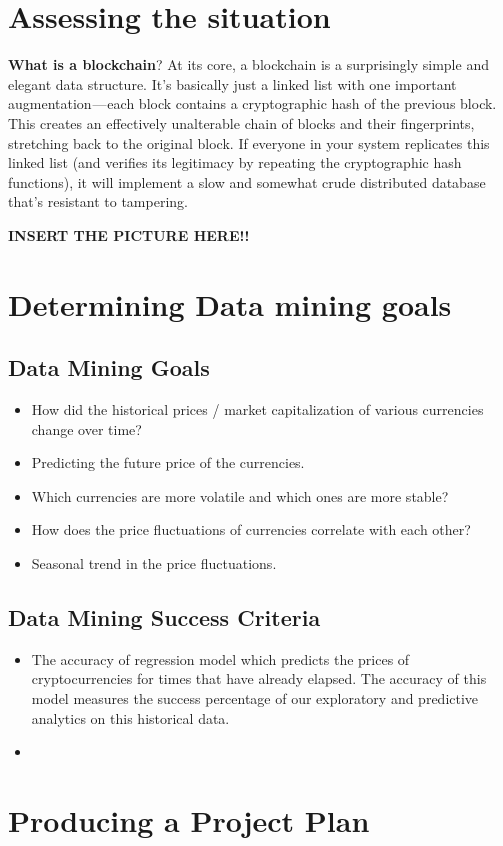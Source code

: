 \documentclass{article}
\begin{document}
\section{Assessing the situation}
\textbf{What is a blockchain}?
At its core, a blockchain is a surprisingly simple and elegant data structure. It’s basically just a linked list with one important augmentation — each block contains a cryptographic hash of the previous block. This creates an effectively unalterable chain of blocks and their fingerprints, stretching back to the original block. If everyone in your system replicates this linked list (and verifies its legitimacy by repeating the cryptographic hash functions), it will implement a slow and somewhat crude distributed database that’s resistant to tampering.

\textbf{INSERT THE PICTURE HERE!!}

\section{Determining Data mining goals}
\subsection{Data Mining Goals}
\begin{itemize}
\item How did the historical prices / market capitalization of various currencies change over time?
\item Predicting the future price of the currencies.
\item Which currencies are more volatile and which ones are more stable?
\item How does the price fluctuations of currencies correlate with each other?
\item Seasonal trend in the price fluctuations.
\end{itemize}

\subsection{Data Mining Success Criteria}
\begin{itemize}
    \item The accuracy of regression model which predicts the prices of cryptocurrencies for times that have already elapsed. The accuracy of this model measures the success percentage of our exploratory and predictive analytics on this historical data.
    \item 
\end{itemize}

\section{Producing a Project Plan}
\end{document}
